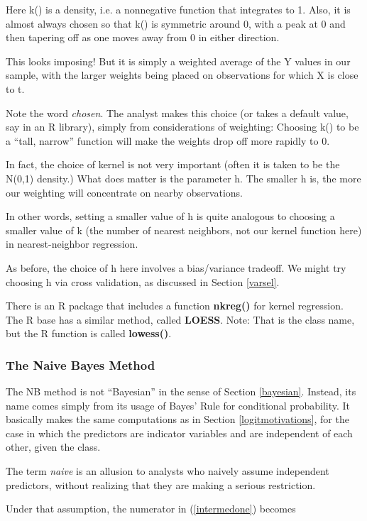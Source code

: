 Here k() is a density, i.e. a nonnegative function that integrates to 1.
Also, it is almost always chosen so that k() is symmetric around 0, with
a peak at 0 and then tapering off as one moves away from 0 in either
direction.

This looks imposing!  But it is simply a weighted average of the Y values
in our sample, with the larger weights being placed on observations for
which X is close to t.  

Note the word {\it chosen}.  The analyst makes this choice (or takes a
default value, say in an R library), simply from considerations of
weighting: Choosing k() to be a ``tall, narrow'' function will make the
weights drop off more rapidly to 0.

In fact, the choice of kernel is not very important (often it is taken
to be the N(0,1) density.)  What does matter is the parameter h.  The
smaller h is, the more our weighting will concentrate on nearby
observations.

In other words, setting a smaller value of h is quite analogous to
choosing a smaller value of k (the number of nearest neighbors, not our
kernel function here) in nearest-neighbor regression.

As before, the choice of h here involves a bias/variance tradeoff.  We
might try choosing h via cross validation, as discussed in Section
\ref{varsel}.

There is an R package that includes a function {\bf nkreg()} for kernel
regression.  The R base has a similar method, called {\bf LOESS}.  Note:
That is the class name, but the R function is called {\bf lowess()}.

\subsubsection{The Naive Bayes Method}

The NB method is not ``Bayesian'' in the sense of Section
\ref{bayesian}.  Instead, its name comes simply from its usage of Bayes'
Rule for conditional probability.  It basically makes the same
computations as in Section \ref{logitmotivations}, for the case in which
the predictors are indicator variables and are independent of each
other, given the class.  

The term {\it naive} is an allusion to analysts who naively assume
independent predictors, without realizing that they are making a serious
restriction.

Under that assumption, the numerator in (\ref{intermedone}) becomes

